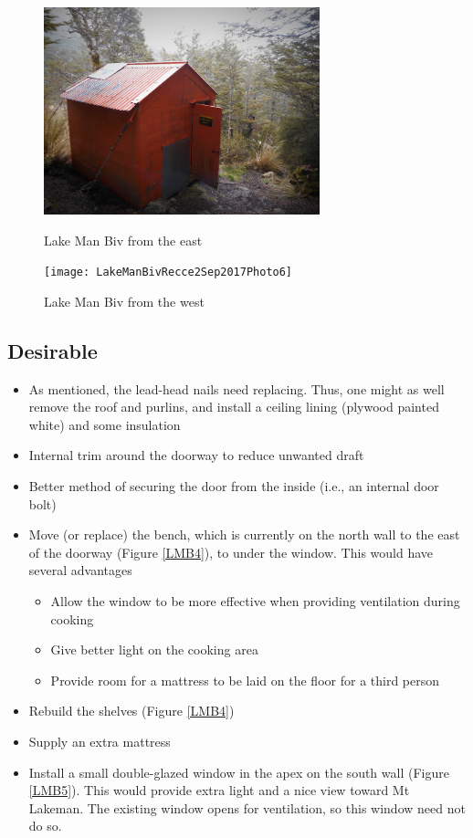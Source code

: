 \documentclass[12pt]{article} %
\begin{document}
\begin{figure}[ht]
\begin{minipage}{.5\linewidth}
\begin{flushleft}
   \includegraphics[width=8cm]{LakeManBivRecce2Sep2017Photo5}
   \caption{Lake Man Biv from the east}
   \label{LMB2}
\end{flushleft}
\end{minipage}
\begin{minipage}{.5\linewidth}
\begin{center}
   \texttt{[image: LakeManBivRecce2Sep2017Photo6]}
   \caption{Lake Man Biv from the west}
   \label{LMB3}
\end{center}
\end{minipage}
\end{figure}

\subsection{Desirable}

\begin{itemize}
 \item As mentioned, the lead-head nails need replacing.  Thus, one might as well remove the roof and purlins, and install a ceiling lining (plywood painted white) and some insulation
 \item Internal trim around the doorway to reduce unwanted draft
 \item Better method of securing the door from the inside (i.e., an internal door bolt)
 \item Move (or replace) the bench, which is currently on the north wall to the east of the doorway (Figure \ref{LMB4}), to under the window.  This would have several advantages
 \begin{itemize}
   \item Allow the window to be more effective when providing ventilation during cooking
   \item Give better light on the cooking area
   \item Provide room for a mattress to be laid on the floor for a third person
 \end{itemize}
 \item Rebuild the shelves (Figure \ref{LMB4})
 \item Supply an extra mattress
 \item Install a small double-glazed window in the apex on the south wall (Figure \ref{LMB5}).  This would provide extra light and a nice view toward Mt Lakeman.  The existing window opens for ventilation, so this window need not do so.
\end{itemize}
\end{document}
